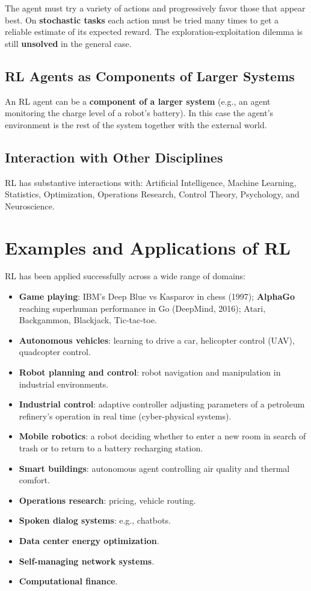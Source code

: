 \documentclass[11pt,a4paper]{article}
\theoremstyle{definition}
\theoremstyle{plain}
\theoremstyle{remark}
\begin{document}
The agent must try a variety of actions and progressively favor those that appear best. On \textbf{stochastic tasks} each action must be tried many times to get a reliable estimate of its expected reward. The exploration-exploitation dilemma is still \textbf{unsolved} in the general case.

\subsection{RL Agents as Components of Larger Systems}

An RL agent can be a \textbf{component of a larger system} (e.g., an agent monitoring the charge level of a robot's battery). In this case the agent's environment is the rest of the system together with the external world.

\subsection{Interaction with Other Disciplines}

RL has substantive interactions with: Artificial Intelligence, Machine Learning, Statistics, Optimization, Operations Research, Control Theory, Psychology, and Neuroscience.


\section{Examples and Applications of RL}

RL has been applied successfully across a wide range of domains:

\begin{itemize}
    \item \textbf{Game playing}: IBM's Deep Blue vs Kasparov in chess (1997); \textbf{AlphaGo} reaching superhuman performance in Go (DeepMind, 2016); Atari, Backgammon, Blackjack, Tic-tac-toe.
    \item \textbf{Autonomous vehicles}: learning to drive a car, helicopter control (UAV), quadcopter control.
    \item \textbf{Robot planning and control}: robot navigation and manipulation in industrial environments.
    \item \textbf{Industrial control}: adaptive controller adjusting parameters of a petroleum refinery's operation in real time (cyber-physical systems).
    \item \textbf{Mobile robotics}: a robot deciding whether to enter a new room in search of trash or to return to a battery recharging station.
    \item \textbf{Smart buildings}: autonomous agent controlling air quality and thermal comfort.
    \item \textbf{Operations research}: pricing, vehicle routing.
    \item \textbf{Spoken dialog systems}: e.g., chatbots.
    \item \textbf{Data center energy optimization}.
    \item \textbf{Self-managing network systems}.
    \item \textbf{Computational finance}.
\end{itemize}
\end{document}
